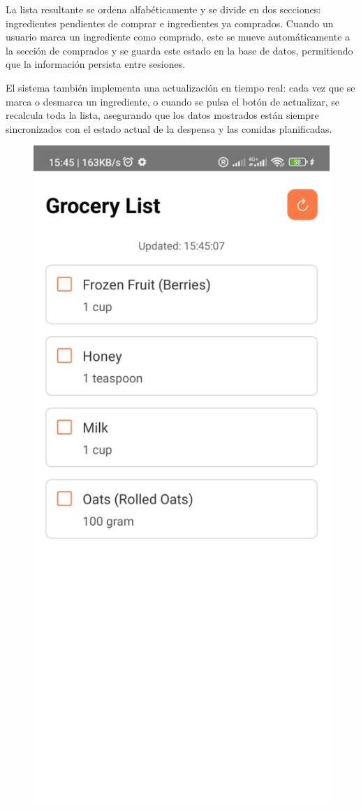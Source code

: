 \documentclass[twoside, openright, 11pt]{report}
\begin{document}
				La lista resultante se ordena alfabéticamente y se divide en dos secciones: ingredientes pendientes de comprar e ingredientes ya comprados. Cuando un usuario marca un ingrediente como comprado, este se mueve automáticamente a la sección de comprados y se guarda este estado en la base de datos, permitiendo que la información persista entre sesiones.
				
				El sistema también implementa una actualización en tiempo real: cada vez que se marca o desmarca un ingrediente, o cuando se pulsa el botón de actualizar, se recalcula toda la lista, asegurando que los datos mostrados están siempre sincronizados con el estado actual de la despensa y las comidas planificadas.
				
				\begin{figure}[H]
					\centering
					\includegraphics[scale=0.3]{imagenes/GroceryListScreen.jpeg}

\end{figure}
\end{document}
